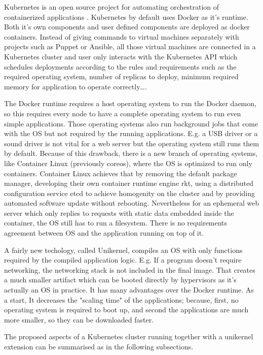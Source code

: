 Kubernetes is an open source project for automating orchestration of containerized applications \cite{Hightower:2017:KUR:3175917}. Kubernetes by default uses Docker as it's runtime. Both it's own components and user defined components are deployed as docker containers. Instead of giving commands to virtual machines separately with projects such as Puppet or Ansible, all those virtual machines are connected in a Kubernetes cluster and user only interacts with the Kubernetes API which schedules deployments according to the rules and requirements such as the required operating system, number of replicas to deploy, minimum required memory for application to operate correctly\ldots.

The Docker runtime requires a host operating system to run the Docker daemon, so this requires every node to have a complete operating system to run even simple applications. Those operating systems also run background jobs that come with the OS but not required by the running applications. E.g. a USB driver or a sound driver is not vital for a web server but the operating system still runs them by default. Because of this drawback, there is a new branch of operating systems, like Container Linux (previously coreos)\cite{coreos}, where the OS is optimized to run only containers. Container Linux achieves that by removing the default package manager, developing their own container runtime engine rkt, using a distributed configuration service etcd to achieve homogenity on the cluster and by providing automated software update without rebooting. Nevertheless for an ephemeral web server which only replies to requests with static data embedded inside the container, the OS still has to run a filesystem. There is no requirements agreement between OS and the application running on top of it.

A fairly new techology, called Unikernel, compiles an OS with only functions required by the compiled application logic. E.g. If a program doesn't require networking, the networking stack is not included in the final image. That creates a much smaller artifact which can be booted directly by hypervisors as it's actually an OS in practice. It has many advantages over the Docker runtime. As a start, It decreases the "scaling time" \cite{Podolskiy:2017:QCA:3069383.3069390} of the applications; because, first, no operating system is required to boot up, and second the applications are much more smaller, so they can be downloaded faster.

The proposed aspects of a Kubernetes cluster running together with a unikernel extension can be summarised as in the following subsections.

